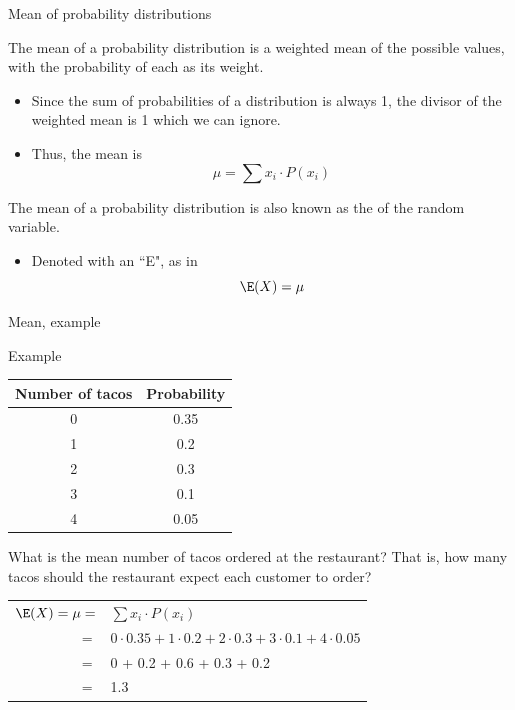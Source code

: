 \documentclass[xcolor=table, handout]{beamer}
\begin{document}
\begin{frame}{Mean of probability distributions}
\begin{block}{}
The mean of a probability distribution is a weighted mean of the possible values, with the probability of each as its weight. 
\begin{itemize}
\pause\item Since the sum of probabilities of a distribution is always 1, the divisor of the weighted mean is 1 which we can ignore.
\pause\item Thus, the mean is
\[\mu = \sum x_i \cdot P(x_i) \]
\end{itemize}
\medskip
\pause
The mean of a probability distribution is also known as the  of the random variable.
\begin{itemize}
\item Denoted with an ``E", as in 
\[\E(X) = \mu \]
\end{itemize}
\end{block}
\end{frame}

\begin{frame}{Mean, example}
\begin{exampleblock}{Example}
{\centering \renewcommand{\arraystretch}{1}
\begin{tabular}{c | c}
Number of tacos & Probability\\
\hline
0 & 0.35\\
1 & 0.2\\
2 & 0.3\\
3 & 0.1\\
4 & 0.05
\end{tabular}\par
\renewcommand{\arraystretch}{1.5}}
\bigskip

What is the mean number of tacos ordered at the restaurant? That is, how many tacos should the restaurant expect each customer to order?\\
\medskip
\pause
{\centering \renewcommand{\arraystretch}{1}
\begin{tabular}{r l}
$\E(X) = \mu =$ & $\sum x_i \cdot P(x_i)$\\
$=$ & $0 \cdot 0.35 + 1 \cdot 0.2 + 2 \cdot 0.3 + 3 \cdot 0.1 + 4 \cdot 0.05$\\
$=$ & 0 + 0.2 + 0.6 + 0.3 + 0.2\\
$=$ & 1.3
\end{tabular}\par
\renewcommand{\arraystretch}{1.5}}

\end{exampleblock}
\end{frame}
\end{document}
